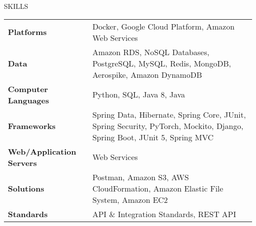 \documentclass{resume} %
\begin{document}
\begin{rSection}{SKILLS}

\begin{tabular}{ @{} >{\bfseries}l @{\hspace{6ex}} l }
Platforms & Docker, Google Cloud Platform, Amazon Web Services \\
Data & Amazon RDS, NoSQL Databases, PostgreSQL, MySQL, Redis, MongoDB, Aerospike, Amazon DynamoDB \\
Computer Languages & Python, SQL, Java 8, Java \\
Frameworks & Spring Data, Hibernate, Spring Core, JUnit, Spring Security, PyTorch, Mockito, Django, Spring Boot, JUnit 5, Spring MVC \\
Web/Application Servers & Web Services \\
Solutions & Postman, Amazon S3, AWS CloudFormation, Amazon Elastic File System, Amazon EC2 \\
Standards & API \& Integration Standards, REST API \\
\end{tabular}\\
\end{rSection}
\end{document}
